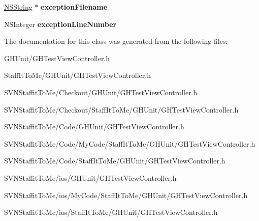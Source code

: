 \begin{DoxyCompactItemize}
\item 
\hypertarget{interface_g_h_test_view_controller_aceb22eefabbfeed6b5522054b6af0c7c}{
\hyperlink{class_n_s_string}{\-N\-S\-String} $\ast$ {\bfseries exception\-Filename}}
\label{interface_g_h_test_view_controller_aceb22eefabbfeed6b5522054b6af0c7c}

\item 
\hypertarget{interface_g_h_test_view_controller_aee024d5adeedb593296b8e306932c646}{
\-N\-S\-Integer {\bfseries exception\-Line\-Number}}
\label{interface_g_h_test_view_controller_aee024d5adeedb593296b8e306932c646}

\end{DoxyCompactItemize}


\-The documentation for this class was generated from the following files\-:\begin{DoxyCompactItemize}
\item 
\-G\-H\-Unit/\-G\-H\-Test\-View\-Controller.\-h\item 
\-Staff\-It\-To\-Me/\-G\-H\-Unit/\-G\-H\-Test\-View\-Controller.\-h\item 
\-S\-V\-N\-Staffit\-To\-Me/\-Checkout/\-G\-H\-Unit/\-G\-H\-Test\-View\-Controller.\-h\item 
\-S\-V\-N\-Staffit\-To\-Me/\-Checkout/\-Staff\-It\-To\-Me/\-G\-H\-Unit/\-G\-H\-Test\-View\-Controller.\-h\item 
\-S\-V\-N\-Staffit\-To\-Me/\-Code/\-G\-H\-Unit/\-G\-H\-Test\-View\-Controller.\-h\item 
\-S\-V\-N\-Staffit\-To\-Me/\-Code/\-My\-Code/\-Staff\-It\-To\-Me/\-G\-H\-Unit/\-G\-H\-Test\-View\-Controller.\-h\item 
\-S\-V\-N\-Staffit\-To\-Me/\-Code/\-Staff\-It\-To\-Me/\-G\-H\-Unit/\-G\-H\-Test\-View\-Controller.\-h\item 
\-S\-V\-N\-Staffit\-To\-Me/ios/\-G\-H\-Unit/\-G\-H\-Test\-View\-Controller.\-h\item 
\-S\-V\-N\-Staffit\-To\-Me/ios/\-My\-Code/\-Staff\-It\-To\-Me/\-G\-H\-Unit/\-G\-H\-Test\-View\-Controller.\-h\item 
\-S\-V\-N\-Staffit\-To\-Me/ios/\-Staff\-It\-To\-Me/\-G\-H\-Unit/\-G\-H\-Test\-View\-Controller.\-h\end{DoxyCompactItemize}
